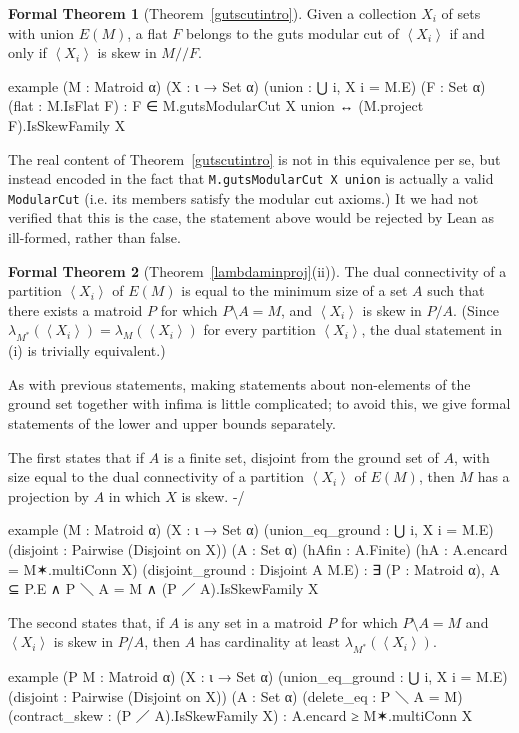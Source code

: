 \documentclass{amsart}
\theoremstyle{plain}
\theoremstyle{definition}
\newcommand{\dcon}{/ \!\! /}
\newcommand{\del}{\!\setminus\!}
\newcommand{\con}{/}
\newcommand{\ab}[1]{\left\langle#1\right\rangle}
\newcommand{\smalltt}[1]{{\small\texttt{#1}}}
\newtheorem*{fthm}{Formal Theorem}
\begin{document}
\begin{fthm}[Theorem~\ref{gutscutintro}]
  Given a collection $X_i$ of sets with union $E(M)$, 
  a flat $F$ belongs to the guts modular cut of $\ab{X_i}$ 
  if and only if $\ab{X_i}$ is skew in $M \dcon F$. 
  \begin{leancode}
example (M : Matroid α) (X : ι → Set α) (union : ⋃ i, X i = M.E) 
  (F : Set α) (flat : M.IsFlat F) :
  F ∈ M.gutsModularCut X union ↔ (M.project F).IsSkewFamily X
  \end{leancode}
  The real content of Theorem~\ref{gutscutintro} is not in this equivalence per se, 
  but instead encoded in the fact that \smalltt{M.gutsModularCut X union} is actually a valid
  \smalltt{ModularCut} (i.e. its members satisfy the modular cut axioms.)
  It we had not verified that this is the case, the statement above 
  would be rejected by Lean as ill-formed, rather than false. 
\end{fthm}

\begin{fthm}[Theorem~\ref{lambdaminproj}(ii)]
The dual connectivity of a partition $\ab{X_i}$ of $E(M)$
is equal to the minimum size of a set $A$ such that there exists a matroid $P$
for which $P \del A = M$, and $\ab{X_i}$ is skew in $P \con A$. 
(Since $\lambda_{M^*}(\ab{X_i}) = \lambda_{M}(\ab{X_i})$ for every partition 
$\ab{X_i}$, the dual statement in (i) is trivially equivalent.)

As with previous statements, making statements about non-elements of the ground set
together with infima is little complicated; to avoid this, 
we give formal statements of the lower and upper bounds separately. 

The first states that if $A$ is a finite set, disjoint from the ground set of $A$,
with size equal to the dual connectivity of a partition $\ab{X_i}$ of $E(M)$,
then $M$ has a projection by $A$ in which $X$ is skew. -/
\begin{leancode}
example (M : Matroid α) (X : ι → Set α)
  (union_eq_ground : ⋃ i, X i = M.E) (disjoint : Pairwise (Disjoint on X))
  (A : Set α) (hAfin : A.Finite) (hA : A.encard = M✶.multiConn X)
  (disjoint_ground : Disjoint A M.E) :
  ∃ (P : Matroid α), A ⊆ P.E ∧ P ＼ A = M ∧ (P ／ A).IsSkewFamily X
\end{leancode}

The second states that, if $A$ is any set in a matroid $P$ for which $P \del A = M$
and $\ab{X_i}$ is skew in $P \con A$, 
then $A$ has cardinality at least $\lambda_{M^*}(\ab{X_i})$.
\begin{leancode}
example (P M : Matroid α) (X : ι → Set α) (union_eq_ground : ⋃ i, X i = M.E)
  (disjoint : Pairwise (Disjoint on X)) (A : Set α) (delete_eq : P ＼ A = M)
  (contract_skew : (P ／ A).IsSkewFamily X) :
  A.encard ≥ M✶.multiConn X
\end{leancode}
\end{fthm}
\end{document}
